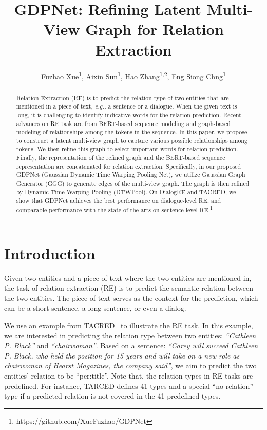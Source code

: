 \documentclass[letterpaper]{article} \usepackage{aaai21}  \usepackage{times}  \usepackage{helvet} \usepackage{courier}  \usepackage[hyphens]{url}  \usepackage{graphicx} \urlstyle{rm} \def\UrlFont{\rm}  \usepackage{graphicx}  \usepackage{natbib}  \usepackage{caption}
\title{GDPNet: Refining Latent Multi-View Graph for Relation Extraction}
\author {


        Fuzhao Xue\textsuperscript{\rm 1}, 
        Aixin Sun\textsuperscript{\rm 1}, 
        Hao Zhang\textsuperscript{\rm 1,2}, 
        Eng Siong Chng\textsuperscript{\rm 1} \\
}
\newcommand{\eg}{\emph{e.g.,}\xspace}
\begin{document}
\maketitle
\begin{abstract}

Relation Extraction (RE) is to predict the relation type of two entities that are mentioned in a piece of text, \eg a sentence or a dialogue. When the given text is long, it is challenging to identify indicative words for the relation prediction. Recent advances on RE task are from BERT-based sequence modeling and graph-based modeling of relationships among the tokens in the sequence. In this paper, we propose to construct a latent multi-view graph to capture various possible relationships among tokens. We then refine this graph to select important words for relation prediction. Finally, the representation of the refined graph and the BERT-based sequence representation are concatenated for relation extraction. Specifically, in our proposed GDPNet (Gaussian Dynamic Time Warping Pooling Net), we utilize Gaussian Graph Generator (GGG) to generate edges of the multi-view graph. The graph is then refined by Dynamic Time Warping Pooling (DTWPool). On DialogRE and TACRED, we show that GDPNet achieves the best performance on dialogue-level RE, and comparable performance with the state-of-the-arts on sentence-level RE.\footnote{https://github.com/XueFuzhao/GDPNet}



\end{abstract}

\section{Introduction}
\label{sec:intro}



\noindent Given two entities and a piece of text where the two entities are mentioned in, the task of relation extraction (RE) is to predict the semantic relation between the two entities. The piece of text serves as the context for the prediction, which can be a short sentence, a long sentence, or even a dialog. 

We use an example from TACRED~\cite{zhang-etal-2017-position} to illustrate the RE task. In this example, we are interested in predicting the relation type between two entities: \textit{``Cathleen P. Black''} and \textit{``chairwoman''}. Based on a sentence: \textit{``Carey will succeed Cathleen P. Black, who held the position for 15 years and will take on a new role as chairwoman of Hearst Magazines, the company said''}, we aim to predict the two entities' relation to be ``per:title''. Note that, the relation types in RE tasks are predefined. For instance, TARCED defines 41 types and a special ``no relation'' type if a predicted relation is not covered in the 41 predefined types. 
\end{document}
